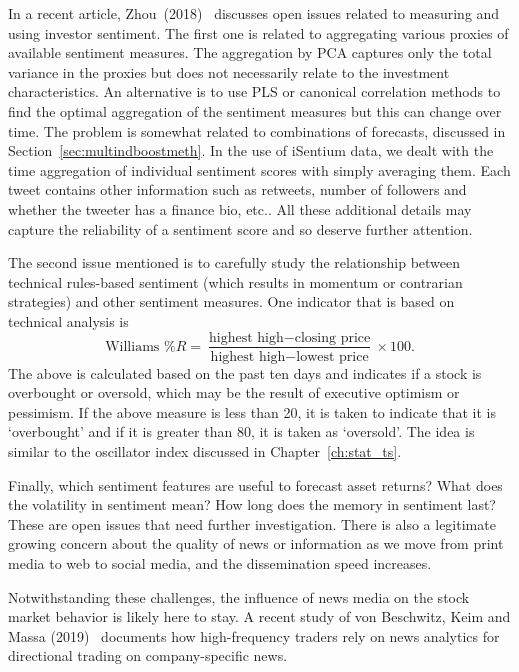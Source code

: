 In a recent article, Zhou~(2018)~\cite{zhou18measure} discusses open issues related to measuring and using investor sentiment. The first one is related to aggregating various proxies of available sentiment measures. The aggregation by PCA captures only the total variance in the proxies but does not necessarily relate to the investment characteristics. An alternative is to use PLS or canonical correlation methods to find the optimal aggregation of the sentiment measures but this can change over time. The problem is somewhat related to combinations of forecasts, discussed in Section~\ref{sec:multindboostmeth}. In the use of iSentium data, we dealt with the time aggregation of individual sentiment scores with simply averaging them. Each tweet contains other information such as retweets, number of followers and whether the tweeter has a finance bio, etc.. All these additional details may capture the reliability of a sentiment score and so deserve further attention. 


The second issue mentioned is to carefully study the relationship between technical rules-based sentiment (which results in momentum or contrarian strategies) and other sentiment measures. One indicator that is based on technical analysis is
	\begin{equation}\label{eqn:williams}
	\text{Williams \% }R= \dfrac{\text{highest high}-\text{closing price}}{\text{highest high}-\text{lowest price}} \times 100.
	\end{equation}
The above is calculated based on the past ten days and indicates if a stock is overbought or oversold, which may be the result of executive optimism or pessimism. If the above measure is less than 20, it is taken to indicate that it is `overbought' and if it is greater than 80, it is taken as `oversold'. The idea is similar to the oscillator index discussed in Chapter~\ref{ch:stat_ts}. 


Finally, which sentiment features are useful to forecast asset returns? What does the volatility in sentiment mean? How long does the memory in sentiment last? These are open issues that need further investigation. There is also a legitimate  growing concern about the quality of news or information as we move from print media to web to social media, and the dissemination speed increases. 

Notwithstanding these challenges, the influence of news media on the stock market behavior is likely here to stay. A recent study of von Beschwitz, Keim and Massa (2019)~\cite{keimmass2019} documents how high-frequency traders rely on news analytics for directional trading on company-specific news.

